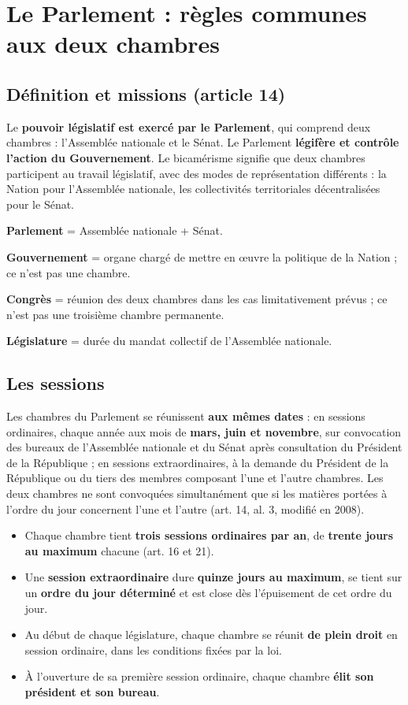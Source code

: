 \documentclass[11pt,a4paper,oneside]{report}
\begin{document}
\chapter{Le Parlement : règles communes aux deux chambres}
\section{Définition et missions (article 14)}
Le \textbf{pouvoir législatif est exercé par le Parlement}, qui comprend deux chambres : l'Assemblée nationale et le Sénat. Le Parlement \textbf{légifère et contrôle l'action du Gouvernement}. Le bicamérisme signifie que deux chambres participent au travail législatif, avec des modes de représentation différents : la Nation pour l'Assemblée nationale, les collectivités territoriales décentralisées pour le Sénat.

\begin{defbox}[title={Définition — Vocabulaire exact}]
\textbf{Parlement} = Assemblée nationale + Sénat.

\textbf{Gouvernement} = organe chargé de mettre en œuvre la politique de la Nation ; ce n'est pas une chambre.

\textbf{Congrès} = réunion des deux chambres dans les cas limitativement prévus ; ce n'est pas une troisième chambre permanente.

\textbf{Législature} = durée du mandat collectif de l'Assemblée nationale.
\end{defbox}
\section{Les sessions}
Les chambres du Parlement se réunissent \textbf{aux mêmes dates} : en sessions ordinaires, chaque année aux mois de \textbf{mars, juin et novembre}, sur convocation des bureaux de l'Assemblée nationale et du Sénat après consultation du Président de la République ; en sessions extraordinaires, à la demande du Président de la République ou du tiers des membres composant l'une et l'autre chambres. Les deux chambres ne sont convoquées simultanément que si les matières portées à l'ordre du jour concernent l'une et l'autre (art. 14, al. 3, modifié en 2008).

\begin{itemize}
  \item Chaque chambre tient \textbf{trois sessions ordinaires par an}, de \textbf{trente jours au maximum} chacune (art. 16 et 21).
  \item Une \textbf{session extraordinaire} dure \textbf{quinze jours au maximum}, se tient sur un \textbf{ordre du jour déterminé} et est close dès l'épuisement de cet ordre du jour.
  \item Au début de chaque législature, chaque chambre se réunit \textbf{de plein droit} en session ordinaire, dans les conditions fixées par la loi.
  \item À l'ouverture de sa première session ordinaire, chaque chambre \textbf{élit son président et son bureau}.
\end{itemize}
\end{document}
